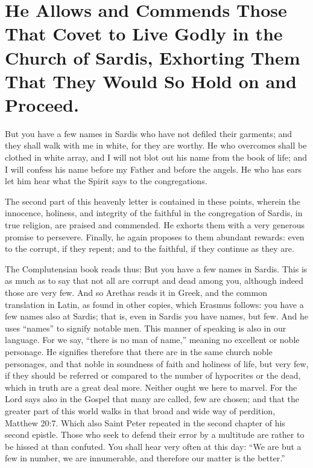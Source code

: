 \chapter[Sermon 16. He Allows and Commends Those That Covet to Live Godly in the Church of Sardis, Exhorting Them That They Would So Hold on and Proceed.]{He Allows and Commends Those That Covet to Live Godly in the Church of Sardis, Exhorting Them That They Would So Hold on and Proceed.}
\label{sermon:016}

But you have a few names in Sardis who have not defiled their garments; and they shall walk with me in white, for they are worthy. He who overcomes shall be clothed in white array, and I will not blot out his name from the book of life; and I will confess his name before my Father and before the angels. He who has ears let him hear what the Spirit says to the congregations.

The second part of this heavenly letter is contained in these points, wherein the innocence, holiness, and integrity of the faithful in the congregation of Sardis, in true religion, are praised and commended. He exhorts them with a very generous promise to persevere. Finally, he again proposes to them abundant rewards: even to the corrupt, if they repent; and to the faithful, if they continue as they are.

The Complutensian book reads thus: But you have a few names in Sardis. This is as much as to say that not all are corrupt and dead among you, although indeed those are very few. And so Arethas reads it in Greek, and the common translation in Latin, as found in other copies, which Erasmus follows: you have a few names also at Sardis; that is, even in Sardis you have names, but few. And he uses “names” to signify notable men. This manner of speaking is also in our language. For we say, “there is no man of name,” meaning no excellent or noble personage. He signifies therefore that there are in the same church noble personages, and that noble in soundness of faith and holiness of life, but very few, if they should be referred or compared to the number of hypocrites or the dead, which in truth are a great deal more. Neither ought we here to marvel. For the Lord says also in the Gospel that many are called, few are chosen; and that the greater part of this world walks in that broad and wide way of perdition, Matthew 20:7. Which also Saint Peter repeated in the second chapter of his second epistle. Those who seek to defend their error by a multitude are rather to be hissed at than confuted. You shall hear very often at this day: “We are but a few in number, we are innumerable, and therefore our matter is the better.”

